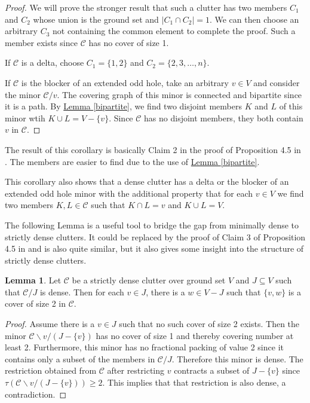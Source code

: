 \documentclass[a4paper, 12pt]{scrbook}
\theoremstyle{definition}
\newtheorem{lemma}[theorem]{Lemma}
\begin{document}
   \begin{proof}
       We will prove the stronger result that such a clutter has two members $C_1$ and $C_2$ whose union is the ground set and $|C_1 \cap C_2|=1$.
       We can then choose an arbitrary $C_3$ not containing the common element to complete the proof.
       Such a member exists since $\mathcal{C}$ has no cover of size 1.

       If $\mathcal{C}$ is a delta, choose $C_1=\{1,2\}$ and $C_2=\{2,3,\ldots,n\}$.

       If $\mathcal{C}$ is the blocker of an extended odd hole, take an arbitrary $v \in V$ and consider the minor $\mathcal{C} / v$.
       The covering graph of this minor is connected and bipartite since it is a path.
       By \hyperref[bipartite]{Lemma \ref*{bipartite}}, we find two disjoint members $K$ and $L$ of this minor wtih $K \cup L = V-\{v\}$.
       Since $\mathcal{C}$ has no disjoint members, they both contain $v$ in $\mathcal{C}$.
   \end{proof}

   The result of this corollary is basically Claim 2 in the proof of Proposition 4.5 in \cite{restrictions}. The members are easier to find due to the use of \hyperref[bipartite]{Lemma \ref*{bipartite}}.

   This corollary also shows that a dense clutter has a delta or the blocker of an extended odd hole minor with the additional property that for each $v \in V$ we find two members $K, L \in \mathcal{C}$ such that $K \cap L = v$ and $K\cup L=V$.

   The following Lemma is a useful tool to bridge the gap from minimally dense to strictly dense clutters. It could be replaced by the proof of Claim 3 of Proposition 4.5 in \cite{restrictions} and is also quite similar, but it also gives some insight into the structure of strictly dense clutters.
   \begin{lemma}\label{covers}
       Let $\mathcal{C}$ be a strictly dense clutter over ground set $V$ and $J \subseteq V$ such that $\mathcal{C} / J$ is dense.
       Then for each $v \in J$, there is a $w \in V-J$ such that $\{v,w\}$ is a cover of size 2 in $\mathcal{C}$.
   \end{lemma}

   \begin{proof}
       Assume there is a $v \in J$ such that no such cover of size 2 exists.
       Then the minor $\mathcal{C} \backslash v/ (J-\{v\})$ has no cover of size 1 and thereby covering number at least 2.
       Furthermore, this minor has no fractional packing of value 2 since it contains only a subset of the members in $\mathcal{C} / J$.
       Therefore this minor is dense.
       The restriction obtained from $\mathcal{C}$ after restricting $v$ contracts a subset of $J-\{v\}$ since $\tau(\mathcal{C} \backslash v/ (J-\{v\}))\geq 2$.
       This implies that that restriction is also dense, a contradiction.
   \end{proof}
\end{document}
